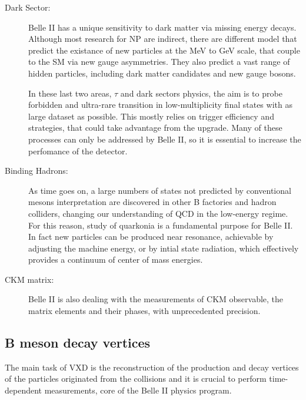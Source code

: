 \begin{description}
\item[Dark Sector:] Belle II has a unique sensitivity to dark matter via missing energy decays. Although most research for NP are indirect, there are different model that predict the existance of new particles at the MeV to GeV scale, that couple to the SM via new gauge asymmetries. They also predict a vast range of hidden particles, including dark matter candidates and new gauge bosons.

In these last two areas, $\tau$ and dark sectors physics, the aim is to probe forbidden and ultra-rare transition in low-multiplicity final states with as large dataset as possible. This mostly relies on trigger efficiency and strategies, that could take advantage from the upgrade. Many of these processes can only be addressed by Belle II, so it is essential to increase the perfomance of the detector.

\item[Binding Hadrons:] As time goes on, a large numbers of states not predicted by conventional mesons interpretation are discovered in other B factories and hadron colliders, changing our understanding of QCD in the low-energy regime. For this reason, study of quarkonia is a fundamental purpose for Belle II. In fact new particles can be produced near resonance, achievable by adjusting the machine energy, or by intial state radiation, which effectively provides a continuum of center of mass energies. 

\item[CKM matrix:] Belle II is also dealing with the measurements of CKM observable, the matrix elements and their phases, with unprecedented precision. 

\end{description}




\subsection{B meson decay vertices} \label{vertex_decay}

The main task of VXD is the reconstruction of the production and decay vertices of the particles originated from the collisions and it is crucial to perform time-dependent measurements, core of the Belle II physics program.\\

